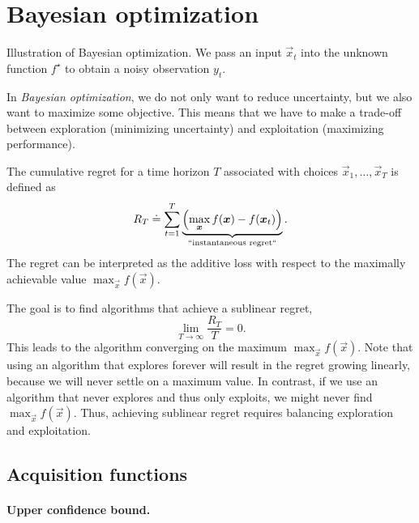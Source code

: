 \section{Bayesian optimization} \label{sec:bo}

\begin{marginfigure}
    \centering
    \caption{Illustration of Bayesian optimization. We pass an input $\vec{x}_t$
    into the unknown function $f^\star$ to obtain a noisy observation $y_t$.}
    \label{fig:bo}
\end{marginfigure}

In \textit{Bayesian optimization}, we do not only want to reduce uncertainty,
but we also want to maximize some objective. This means that we have to make a trade-off between
exploration (minimizing uncertainty) and exploitation (maximizing performance).

\begin{definition}[Regret]
  The cumulative regret for a time horizon $T$ associated with choices
  $\vec{x}_1,\ldots,\vec{x}_T$ is defined as \[
    R_T \doteq \sum_{t=1}^T \underbrace{\lft(\max_{\vec{x}} f(\vec{x}) - f(\vec{x}_t)\rgt)}_{\text{``instantaneous regret``}}
  .\]
  The regret can be interpreted as the additive loss with respect to the
  maximally achievable value $\max_{\vec{x}} f(\vec{x})$.
\end{definition}

The goal is to find algorithms that achieve a sublinear regret, \[
  \lim_{T\to\infty} \frac{R_T}{T} = 0
.\]
This leads to the algorithm converging on the maximum $\max_{\vec{x}}
f(\vec{x})$. Note that using an algorithm that explores forever will result in
the regret growing linearly, because we will never settle on a maximum value.
In contrast, if we use an algorithm that never explores and thus only
exploits, we might never find $\max_{\vec{x}} f(\vec{x})$. Thus, achieving
sublinear regret requires balancing exploration and exploitation.

\subsection{Acquisition functions}

\paragraph{Upper confidence bound.}

